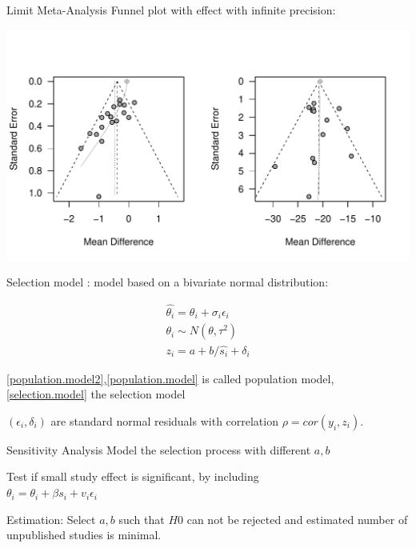 \documentclass[english]{beamer}\usepackage[]{graphicx}\usepackage[]{color}
\makeatletter
\def\maxwidth{ %
  \ifdim\Gin@nat@width>\linewidth
    \linewidth
  \else
    \Gin@nat@width
  \fi
}
\newenvironment{knitrout}{}{} %
\makeatother
\begin{document}
\begin{frame}[fragile]{Limit Meta-Analysis}
Funnel plot with effect with infinite precision:

\vspace{-1.1cm}
\begin{knitrout}
\color{fgcolor}
\includegraphics[width=\maxwidth]{figure/unnamed-chunk-9-1} 

\end{knitrout}
\end{frame}



\begin{frame}{Selection model}
\citet{Copas1}: model based on a bivariate normal distribution:

\vspace{-8mm}
\begin{align}
\hat{\theta_i} = \theta_{i} + \sigma_i\epsilon_i \label{population.model2} \\
\theta_i \sim N(\theta, \tau^2) \label{population.model} \\
z_i = a + b/\hat{s_i} + \delta_i \label{selection.model}
\end{align}

\ref{population.model2},\ref{population.model} is called population model, \ref{selection.model} the selection model

$(\epsilon_i, \delta_i)$ are standard normal residuals with correlation $\rho = cor(y_i, z_i)$.
\end{frame}


\begin{frame}[fragile]{Sensitivity Analysis}
Model the selection process with different $a,b$

Test if small study effect is significant, by including \\ $\theta_i = \theta_i + \beta s_i + v_{i}\epsilon_i$

Estimation: Select $a, b$ such that $H0$ can not be rejected and estimated
number of unpublished studies is minimal.
\end{frame}
\end{document}
